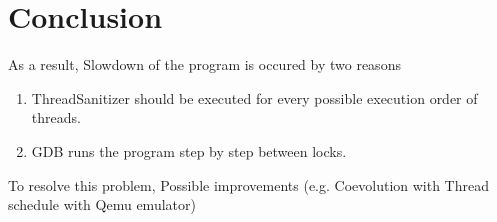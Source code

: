\documentclass[sigconf]{acmart}
\begin{document}
\section{Conclusion}
As a result,
Slowdown of the program is occured by two reasons
\begin{enumerate}
    \item ThreadSanitizer should be executed for every possible execution order of threads.
    \item GDB runs the program step by step between locks.
\end{enumerate}
To resolve this problem, 
Possible improvements (e.g. Coevolution with Thread schedule with Qemu emulator)
\end{document}
